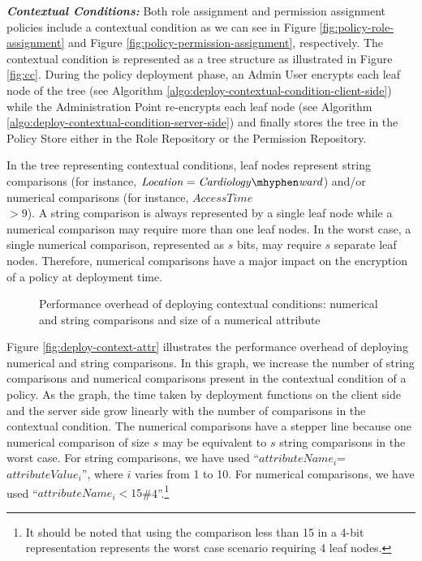 \documentclass[final,5p,times,twocolumn]{elsarticle}
\begin{document}
\emph{\textbf{Contextual Conditions:}} 
Both role assignment and permission assignment policies include a contextual condition as we can see in Figure \ref{fig:policy-role-assignment} and Figure \ref{fig:policy-permission-assignment}, respectively. The contextual condition is represented as a tree structure as illustrated in Figure \ref{fig:cc}. During the policy deployment phase, an Admin User encrypts each leaf node of the tree (see Algorithm \ref{algo:deploy-contextual-condition-client-side}) while the Administration Point re-encrypts each leaf node (see Algorithm \ref{algo:deploy-contextual-condition-server-side}) and finally stores the tree in the Policy Store either in the Role Repository or the Permission Repository. 

In the tree representing contextual conditions, leaf nodes represent string comparisons (for instance, $\mathit{Location = Cardiology \mhyphen ward}$) and/or numerical comparisons (for instance, $\mathit{Access Time}$ \\ $\mathit{> 9}$). A string comparison is always represented by a single leaf node while a numerical comparison may require more than one leaf nodes. In the worst case, a single numerical comparison, represented as $s$ bits, may require $s$ separate leaf nodes. Therefore, numerical comparisons have a major impact on the encryption of a policy at deployment time.

\begin{figure*}
\centering
{}
\caption{Performance overhead of deploying contextual conditions:  numerical and string comparisons and  size of a numerical attribute}
\label{fig:policy-deployment-context}
\end{figure*}

Figure \ref{fig:deploy-context-attr} illustrates the performance overhead of deploying numerical and string comparisons. In this graph, we increase the number of string comparisons and numerical comparisons present in the contextual condition of a policy. As the graph, the time taken by deployment functions on the client side and the server side grow linearly with the number of comparisons in the contextual condition. The numerical comparisons have a stepper line because one numerical comparison of size $s$ may be equivalent to $s$ string comparisons in the worst case. For string comparisons, we have used ``$attributeName_i$=$attributeValue_i$'', where $i$ varies from 1 to 10. For numerical comparisons, we have used ``$attributeName_i<15$\#4''.\footnote{It should be noted that using the comparison less than 15 in a 4-bit representation represents the worst case scenario requiring 4 leaf nodes.}
\end{document}
